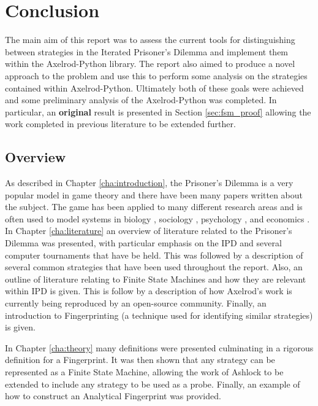 
\chapter{Conclusion}\label{cha:conclusion}

The main aim of this report was to assess the current tools for distinguishing between strategies in the Iterated Prisoner's Dilemma and implement them within the Axelrod-Python library.
The report also aimed to produce a novel approach to the problem and use this to perform some analysis on the strategies contained within Axelrod-Python.
Ultimately both of these goals were achieved and some preliminary analysis of the Axelrod-Python was completed.
In particular, an \textbf{original} result is presented in Section \ref{sec:fsm_proof} allowing the work completed in previous literature to be extended further.



\section{Overview}

As described in Chapter \ref{cha:introduction}, the Prisoner's Dilemma is a very popular model in game theory and there have been many papers written about the subject.
The game has been applied to many different research areas and is often used to model systems in biology \cite{Sigmund1999}, sociology \cite{Franken2005}, psychology \cite{Ishibuchi2005}, and economics \cite{Chong2005}.
In Chapter \ref{cha:literature} an overview of literature related to the Prisoner's Dilemma was presented, with particular emphasis on the IPD and several computer tournaments that have be held.
This was followed by a description of several common strategies that have been used throughout the report.
Also, an outline of literature relating to Finite State Machines and how they are relevant within IPD is given.
This is follow by a description of how Axelrod's work is currently being reproduced by an open-source community.
Finally, an introduction to Fingerprinting (a technique used for identifying similar strategies) is given.

In Chapter \ref{cha:theory} many definitions were presented culminating in a rigorous definition for a Fingerprint.
It was then shown that any strategy can be represented as a Finite State Machine, allowing the work of Ashlock to be extended to include any strategy to be used as a probe.
Finally, an example of how to construct an Analytical Fingerprint was provided.

